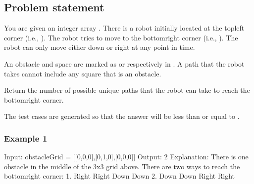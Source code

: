 \documentclass[letterpaper,12pt,english]{book}
\begin{document}
\subsection{Problem statement\sphinxfootnotemark[99]}
\label{\detokenize{Dynamic_Programming/05_DP_63_Unique_Paths_II:problem-statement}}%
\begin{footnotetext}[99]\sphinxAtStartFootnote
{}
%
\end{footnotetext}\ignorespaces 
\sphinxAtStartPar
You are given an  integer array . There is a robot initially located at the top\sphinxhyphen{}left corner (i.e., ). The robot tries to move to the bottom\sphinxhyphen{}right corner (i.e., ). The robot can only move either down or right at any point in time.

\sphinxAtStartPar
An obstacle and space are marked as  or  respectively in . A path that the robot takes cannot include any square that is an obstacle.

\sphinxAtStartPar
Return the number of possible unique paths that the robot can take to reach the bottom\sphinxhyphen{}right corner.

\sphinxAtStartPar
The test cases are generated so that the answer will be less than or equal to .


\subsubsection{Example 1}
\label{\detokenize{Dynamic_Programming/05_DP_63_Unique_Paths_II:example-1}}
\sphinxAtStartPar
{}

\begin{sphinxVerbatim}[commandchars=\\\{\}]
Input: obstacleGrid = [[0,0,0],[0,1,0],[0,0,0]]
Output: 2
Explanation: There is one obstacle in the middle of the 3x3 grid above.
There are two ways to reach the bottom\PYGZhy{}right corner:
1. Right \PYGZhy{}\PYGZgt{} Right \PYGZhy{}\PYGZgt{} Down \PYGZhy{}\PYGZgt{} Down
2. Down \PYGZhy{}\PYGZgt{} Down \PYGZhy{}\PYGZgt{} Right \PYGZhy{}\PYGZgt{} Right
\end{sphinxVerbatim}
\end{document}
